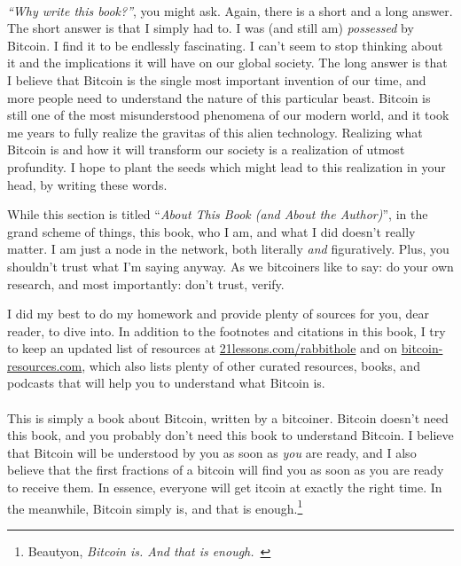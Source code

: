 \paragraph{} \textit{\enquote{Why write this book?}}, you might
ask. Again, there is a short and a long answer. The short answer is that I
simply had to. I was (and still am) \textit{possessed} by Bitcoin. I find it to
be endlessly fascinating. I can't seem to stop thinking about it and the
implications it will have on our global society. The long answer is that I
believe that Bitcoin is the single most important invention of our time, and
more people need to understand the nature of this particular beast. Bitcoin is
still one of the most misunderstood phenomena of our modern world, and it took
me years to fully realize the gravitas of this alien technology. Realizing what
Bitcoin is and how it will transform our society is a realization of utmost
profundity. I hope to plant the seeds which might lead to this realization in
your head, by writing these words.

While this section is titled \enquote{\textit{About This Book (and About the
Author)}}, in the grand scheme of things, this book, who I am, and what I did
doesn't really matter. I am just a node in the network, both literally
\textit{and} figuratively. Plus, you shouldn't trust what I'm saying anyway. As
we bitcoiners like to say: do your own research, and most importantly: don't
trust, verify.

I did my best to do my homework and provide plenty of sources for you, dear
reader, to dive into. In addition to the footnotes and citations in this book, I
try to keep an updated list of resources at
\href{https://21lessons.com/rabbithole}{21lessons.com/rabbithole} and on
\href{https://bitcoin-resources.com}{bitcoin-resources.com}, which also lists
plenty of other curated resources, books, and podcasts that will help you to
understand what Bitcoin is.

\paragraph{} This is simply a book about Bitcoin, written by a bitcoiner.
Bitcoin doesn't need this book, and you probably don't need this book to
understand Bitcoin. I believe that Bitcoin will be understood by you as soon as
\textit{you} are ready, and I also believe that the first fractions of a bitcoin
will find you as soon as you are ready to receive them. In essence, everyone
will get \bitcoinB{}itcoin at exactly the right time. In the meanwhile, Bitcoin
simply is, and that is enough.\footnote{Beautyon, \textit{Bitcoin is. And that
is enough.}~\cite{bitcoin-is}}
